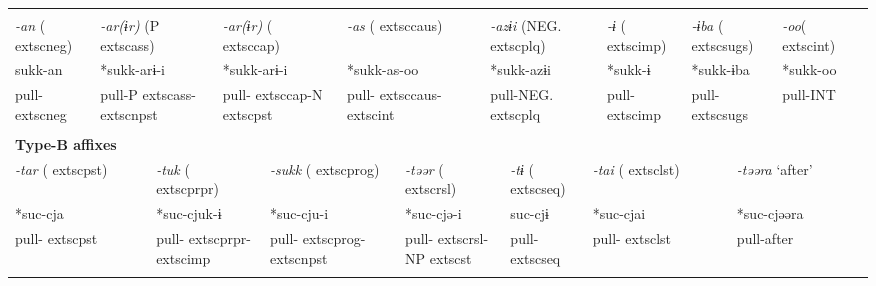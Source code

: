 \tabletail{}
\tablelasttail{}
\begin{tabularx}{\textwidth}{XXXXXXXXXXXXXXXXXXXXXXXX}
\lsptoprule
\multicolumn{24}{X}{{\bfseries Type-A affixes}}\\
{ \textit{{}-an} (	extsc{neg})} & \multicolumn{4}{X}{{ \textit{{}-ar(ɨr)} (P	extsc{ass})}} & \multicolumn{5}{X}{{ \textit{{}-ar(ɨr)} (	extsc{cap})}} & \multicolumn{4}{X}{{ \textit{{}-as} (	extsc{caus})}} & \multicolumn{4}{X}{{ \textit{{}-azɨi} (NEG.	extsc{plq})}} & \multicolumn{2}{X}{{ \textit{{}-ɨ} (	extsc{imp})}} & \multicolumn{2}{X}{{ \textit{{}-ɨba} (	extsc{sugs})}} & { \textit{{}-oo}(	extsc{int})} & \\
{ sukk-an} & \multicolumn{4}{X}{{ *sukk-arɨ-i}} & \multicolumn{5}{X}{{ *sukk-arɨ-i}} & \multicolumn{4}{X}{{ *sukk-as-oo}} & \multicolumn{4}{X}{{ *sukk-azɨi}} & \multicolumn{2}{X}{{ *sukk-ɨ}} & \multicolumn{2}{X}{{ *sukk-ɨba}} & { *sukk-oo} & \\
pull-	extsc{neg} & \multicolumn{4}{X}{pull-P	extsc{ass}-	extsc{npst}} & \multicolumn{5}{X}{pull-	extsc{cap}-N	extsc{pst}} & \multicolumn{4}{X}{pull-	extsc{caus}-	extsc{int}} & \multicolumn{4}{X}{pull-NEG.	extsc{plq}} & \multicolumn{2}{X}{pull-	extsc{imp}} & \multicolumn{2}{X}{pull-	extsc{sugs}} & pull-INT & \\
\multicolumn{24}{X}{}\\
\multicolumn{24}{X}{{\bfseries Type-B affixes}}\\
\multicolumn{3}{X}{{ \textit{{}-tar} (	extsc{pst})}} & \multicolumn{5}{X}{{ \textit{{}-tuk} (	extsc{prpr})}} & \multicolumn{3}{X}{{ \textit{{}-sukk} (	extsc{prog})}} & \multicolumn{4}{X}{{ \textit{{}-təər} (	extsc{rsl})}} & \multicolumn{2}{X}{{ \textit{{}-tɨ} (	extsc{seq})}} & \multicolumn{4}{X}{{ \textit{{}-tai} (	extsc{lst})}} & \multicolumn{3}{X}{{ \textit{{}-təəra} ‘after’}}\\
\multicolumn{3}{X}{{ *suc-cja}} & \multicolumn{5}{X}{{ *suc-cjuk-ɨ}} & \multicolumn{3}{X}{{ *suc-cju-i}} & \multicolumn{4}{X}{{ *suc-cjə-i}} & \multicolumn{2}{X}{{ suc-cjɨ}} & \multicolumn{4}{X}{{ *suc-cjai}} & \multicolumn{3}{X}{{ *suc-cjəəra}}\\
\multicolumn{3}{X}{pull-	extsc{pst}} & \multicolumn{5}{X}{pull-	extsc{prpr}-	extsc{imp}} & \multicolumn{3}{X}{pull-	extsc{prog}-	extsc{npst}} & \multicolumn{4}{X}{pull-	extsc{rsl}-NP	extsc{st}} & \multicolumn{2}{X}{pull-	extsc{seq}} & \multicolumn{4}{X}{pull-	extsc{lst}} & \multicolumn{3}{X}{{ pull-after}}\\
\multicolumn{3}{X}{} & \multicolumn{5}{X}{} & \multicolumn{3}{X}{} & \multicolumn{4}{X}{} & \multicolumn{2}{X}{} & \multicolumn{4}{X}{} & \multicolumn{3}{X}{}\\

\end{tabularx}
